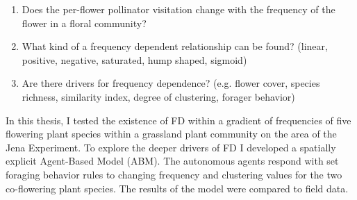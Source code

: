 \begin{enumerate}
	\item Does the per-flower pollinator visitation change with the frequency of the flower in a floral community? \\

	\item	What kind of a frequency dependent relationship can be found? (linear, positive, negative, saturated, hump shaped, sigmoid)\\

	\item	Are there drivers for frequency dependence? (e.g. flower cover, species richness, similarity index, degree of clustering, forager behavior)\\

\end{enumerate}

In this thesis, I tested the existence of FD within a gradient of frequencies of five flowering plant species within a grassland plant community on the area of the Jena Experiment. 
To explore the deeper drivers of FD I developed a spatially explicit Agent-Based Model (ABM). The autonomous agents respond with set foraging behavior rules to changing frequency and clustering values for the two co-flowering plant species. The results of the model were compared to field data.


